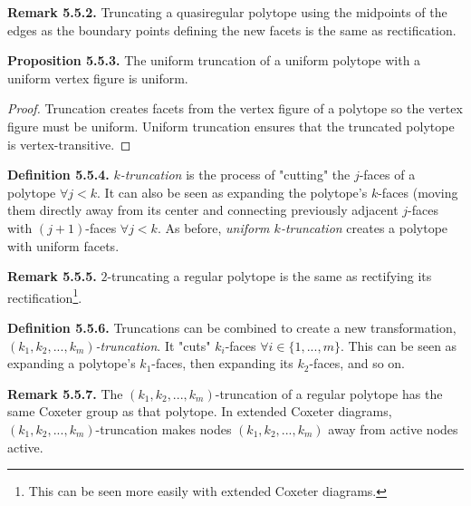 \documentclass[../main.tex]{subfiles}
\begin{document}
\noindent\textbf{Remark 5.5.2.} Truncating a quasiregular polytope using the midpoints of the edges as the boundary points defining the new facets is the same as rectification.\newline

\noindent\textbf{Proposition 5.5.3.} The uniform truncation of a uniform polytope with a uniform vertex figure is uniform.
\begin{proof}
    Truncation creates facets from the vertex figure of a polytope so the vertex figure must be uniform. Uniform truncation ensures that the truncated polytope is vertex-transitive.
\end{proof}

\noindent\textbf{Definition 5.5.4.} \textit{$k$-truncation} is the process of "cutting" the $j$-faces of a polytope $\forall j<k$. It can also be seen as expanding the polytope's $k$-faces (moving them directly away from its center and connecting previously adjacent $j$-faces with $(j+1)$-faces $\forall j<k$. As before, \textit{uniform $k$-truncation} creates a polytope with uniform facets.\newline

\noindent\textbf{Remark 5.5.5.} $2$-truncating a regular polytope is the same as rectifying its rectification\footnote{This can be seen more easily with extended Coxeter diagrams.}.\newline

\noindent\textbf{Definition 5.5.6.} Truncations can be combined to create a new transformation, \textit{$(k_1,k_2,...,k_m)$-truncation}. It "cuts" $k_i$-faces $\forall i \in \{1,...,m\}$. This can be seen as expanding a polytope's $k_1$-faces, then expanding its $k_2$-faces, and so on. \newline

\noindent\textbf{Remark 5.5.7.} The $(k_1,k_2,...,k_m)$-truncation of a regular polytope has the same Coxeter group as that polytope. In extended Coxeter diagrams, $(k_1,k_2,...,k_m)$-truncation makes nodes $(k_1,k_2,...,k_m)$ away from active nodes active.\newline
\end{document}
